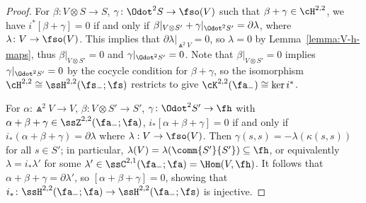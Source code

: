 \begin{proof}
	For $\beta\colon V\otimes S\to S$, $\gamma\colon \Odot^2S\to\fso(V)$ such that $\beta+\gamma\in\cH^{2,2}$, we have $i^*[\beta+\gamma]=0$ if and only if $\beta|_{V\otimes S'}+\gamma|_{\Odot^2S'}=\partial\lambda$, where $\lambda\colon V\to\fso(V)$. This implies that $\partial\lambda|_{\Wedge^2 V}=0$, so $\lambda=0$ by Lemma~\ref{lemma:V-h-maps}, thus $\beta|_{V\otimes S'}=0$ and $\gamma|_{\Odot^2S'}=0$. Note that $\beta|_{V\otimes S'}=0$ implies $\gamma|_{\Odot^2S'}=0$ by the cocycle condition for $\beta+\gamma$, so the isomorphism $\cH^{2,2}\cong\ssH^{2,2}(\fs_-;\fs)$ restricts to give $\cK^{2,2}(\fa_-)\cong \ker i^*$.
	
	For $\alpha\colon \Wedge^2V\to V$, $\beta\colon V\otimes S'\to S'$, $\gamma\colon \Odot^2S'\to\fh$ with $\alpha+\beta+\gamma\in\ssZ^{2,2}(\fa_-;\fa)$, $i_*[\alpha+\beta+\gamma]=0$ if and only if $i_*(\alpha+\beta+\gamma)=\partial\lambda$ where $\lambda:V\to\fso(V)$. Then $\gamma(s,s)=-\lambda(\kappa(s,s))$ for all $s\in S'$; in particular, $\lambda(V)=\lambda(\comm{S'}{S'})\subseteq\fh$, or equivalently $\lambda=i_*\lambda'$ for some $\lambda'\in\ssC^{2,1}(\fa_-;\fa)=\Hom(V,\fh)$. It follows that $\alpha+\beta+\gamma=\partial\lambda'$, so $[\alpha+\beta+\gamma]=0$, showing that $i_*\colon \ssH^{2,2}(\fa_-;\fa)\to \ssH^{2,2}(\fa_-;\fs)$ is injective.
\end{proof}

